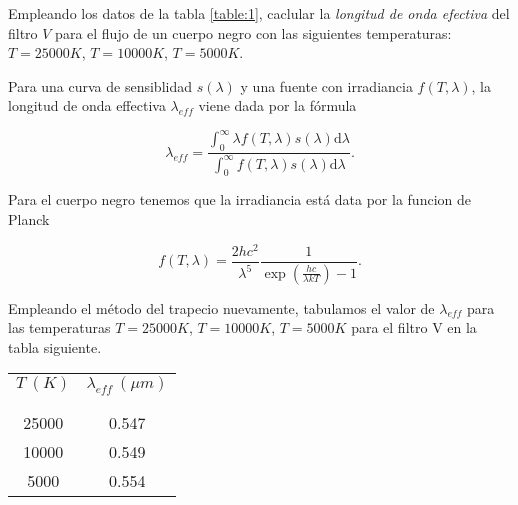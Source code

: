 \documentclass[12pt,a4paper]{practice}
\newcommand\integrate[4]{%
    \int_{#3}^{#4} {#1 \mathrm{d} #2}
}
\begin{document}
    \begin{problem}\label{prob:2}
        Empleando los datos de la tabla \ref{table:1}, caclular la \emph{longitud de onda efectiva} del filtro $V$ para el flujo de un cuerpo negro con las siguientes temperaturas: $T = 25000 K$, $T = 10000 K$, $T = 5000 K$.

        \begin{solution}
            Para una curva de sensiblidad $s\left(\lambda \right)$ y una fuente con irradiancia $f(T, \lambda)$, la longitud de onda effectiva $\lambda_{eff}$ viene dada por la fórmula

            \begin{equation}\label{eq:effective_wavelength}
                \lambda_{eff} = \frac{\displaystyle\integrate{\lambda f(T, \lambda) s(\lambda)}{\lambda}{0}{\infty} }{\displaystyle\integrate{f(T, \lambda) s(\lambda)}{\lambda}{0}{\infty}}.
            \end{equation}

            Para el cuerpo negro tenemos que la irradiancia está data por la funcion de Planck

            \begin{equation}\label{eq:effective_wavelength}
                f(T, \lambda) = \frac{2 h c^2}{\lambda^5}\frac{1}{\exp(\frac{h c}{\lambda k T}) - 1}.
            \end{equation}

            Empleando el método del trapecio nuevamente, tabulamos el valor de $\lambda_{eff}$ para las temperaturas $T = 25000 K$, $T = 10000 K$, $T = 5000 K$ para el filtro V en la tabla siguiente.

            \begin{table}[h!]
                \centering
                \begin{tabular}{ c | c }
                    $T\ (K)$  & $\lambda_{eff}\ (\mu m)$ \\
                      &  \\[-0.8em]\hline
                      &  \\[-0.8em]
                    25000  & 0.547 \\
                    10000  & 0.549 \\
                    5000   & 0.554 \\
                    \hline
                \end{tabular}
            \end{table}
        \end{solution}
    \end{problem}
\end{document}
